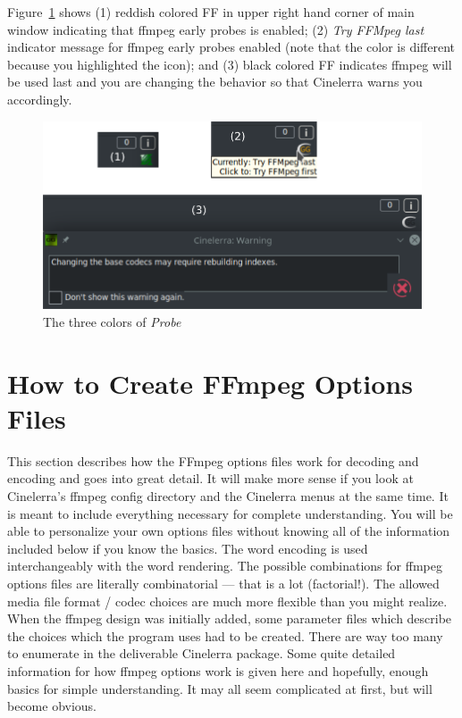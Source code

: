 Figure~\ref{fig:ff} shows (1) reddish colored FF in upper right hand corner of main window indicating
that ffmpeg early probes is enabled; (2) \textit{Try FFMpeg last}  indicator message for ffmpeg early probes enabled (note that the color is different because you highlighted the icon); and (3) black colored FF indicates ffmpeg will be used last and you are changing the behavior so that Cinelerra warns you accordingly.

\begin{figure}[htpb]
    \centering
    \includegraphics[width=0.7\linewidth]{images/ff.png}
    \caption{The three colors of \textit{Probe}}
    \label{fig:ff}
\end{figure}

\section{How to Create FFmpeg Options Files}%
\label{sec:create_ffmpeg_options_files}

This section describes how the FFmpeg options files work for decoding and encoding and goes into great detail.  It will make more sense if you look at Cinelerra's ffmpeg config directory and the Cinelerra menus at the same time.  
It is meant to include everything necessary for complete understanding.  You will be able to personalize your own options files without knowing all of the information included below if you know the basics.  The word encoding is used interchangeably with the word rendering.
The possible combinations for ffmpeg options files are literally combinatorial --- that is a lot (factorial!).  The allowed media file format / codec choices are much more flexible than you might realize.  When the ffmpeg design was initially added, some parameter files which describe the choices which the program uses had to be created.  There are way too many to enumerate in the deliverable Cinelerra package.  Some quite detailed information for how ffmpeg options work is given here and hopefully, enough basics for simple understanding.  It may all seem complicated at first, but will become obvious.


